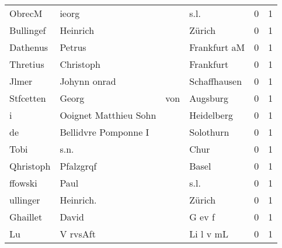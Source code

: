 \begin{center}
\begin{tiny}
\begin{longtabu}{llllrr}
                   ObrecM &                              ieorg &             &                                        s.l. &          0 &         1 \\
                Bullingef &                           Heinrich &             &                                      Zürich &          0 &         1 \\
                 Dathenus &                             Petrus &             &                                Frankfurt aM &          0 &         1 \\
                 Thretius &                          Christoph &             &                                   Frankfurt &          0 &         1 \\
                    Jlmer &                       Johynn onrad &             &                                Schaffhausen &          0 &         1 \\
                Stfcetten &                              Georg &         von &                                    Augsburg &          0 &         1 \\
                        i &              Ooignet Matthieu Sohn &             &                                  Heidelberg &          0 &         1 \\
                       de &               Bellidvre Pomponne I &             &                                   Solothurn &          0 &         1 \\
                     Tobi &                               s.n. &             &                                        Chur &          0 &         1 \\
                Qhristoph &                          Pfalzgrqf &             &                                       Basel &          0 &         1 \\
                  ffowski &                               Paul &             &                                        s.l. &          0 &         1 \\
                 ullinger &                          Heinrich. &             &                                      Zürich &          0 &         1 \\
                 Ghaillet &                              David &             &                                      G ev f &          0 &         1 \\
                       Lu &                           V rvsAft &             &                                   Li l v mL &          0 &         1 \\

\end{longtabu}
\end{tiny}
\end{center}
